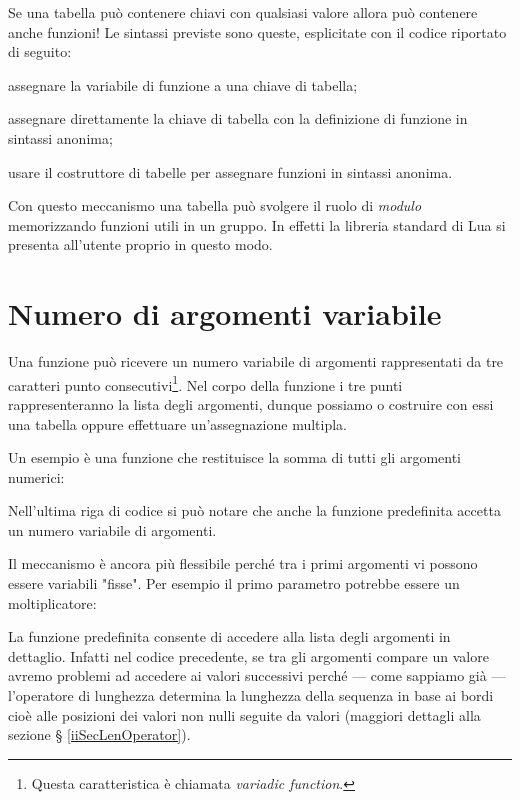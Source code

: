 Se una tabella può contenere chiavi con qualsiasi valore allora può contenere
anche funzioni! Le sintassi previste sono queste, esplicitate con il codice
riportato di seguito:
\begin{compactitemize}
\item assegnare la variabile di funzione a una chiave di tabella;
\item assegnare direttamente la chiave di tabella con la definizione di funzione
in sintassi anonima;
\item usare il costruttore di tabelle per assegnare funzioni in sintassi
anonima.
\end{compactitemize}

Con questo meccanismo una tabella può svolgere il ruolo di \emph{modulo}
memorizzando funzioni utili in un gruppo. In effetti la libreria standard
di Lua si presenta all'utente proprio in questo modo.


\section{Numero di argomenti variabile}

Una funzione può ricevere un numero variabile di argomenti rappresentati da
 tre caratteri punto consecutivi\footnote{Questa
caratteristica è chiamata \emph{variadic function}.}. Nel corpo della funzione i
tre punti rappresenteranno la lista degli argomenti, dunque possiamo o costruire
con essi una tabella oppure effettuare un'assegnazione multipla.

Un esempio è una funzione che restituisce la somma di tutti gli argomenti
numerici:

Nell'ultima riga di codice si può notare che anche la funzione predefinita
 accetta un numero variabile di argomenti.

Il meccanismo è ancora più flessibile perché tra i primi argomenti vi possono
essere variabili "fisse". Per esempio il primo parametro potrebbe essere un
moltiplicatore:


La funzione predefinita  consente di accedere alla
lista degli argomenti in dettaglio. Infatti nel codice precedente, se tra gli
argomenti compare un valore  avremo problemi ad accedere ai valori
successivi perché --- come sappiamo già --- l'operatore di lunghezza \key{\#}
determina la lunghezza della sequenza in base ai bordi cioè alle posizioni dei
valori non nulli seguite da valori  (maggiori dettagli alla sezione \S
\ref{iiSecLenOperator}).

